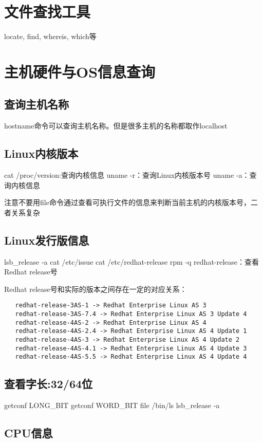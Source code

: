 \section{文件查找工具}
locate, find, whereis, which等
\section{主机硬件与OS信息查询}
\subsection*{查询主机名称}
hostname命令可以查询主机名称。但是很多主机的名称都取作localhost
\subsection*{Linux内核版本}
\begin{shellcmd}
cat /proc/version:查询内核信息
uname -r：查询Linux内核版本号
uname -a：查询内核信息
\end{shellcmd}
注意不要用file命令通过查看可执行文件的信息来判断当前主机的内核版本号，二者关系复杂
\subsection*{Linux发行版信息}
\begin{shellcmd}
lsb_release -a 
cat /etc/issue
cat /etc/redhat-release
rpm -q redhat-release：查看Redhat release号
\end{shellcmd}
Redhat release号和实际的版本之间存在一定的对应关系：
\begin{verbatim}
   redhat-release-3AS-1 -> Redhat Enterprise Linux AS 3
   redhat-release-3AS-7.4 -> Redhat Enterprise Linux AS 3 Update 4
   redhat-release-4AS-2 -> Redhat Enterprise Linux AS 4
   redhat-release-4AS-2.4 -> Redhat Enterprise Linux AS 4 Update 1
   redhat-release-4AS-3 -> Redhat Enterprise Linux AS 4 Update 2
   redhat-release-4AS-4.1 -> Redhat Enterprise Linux AS 4 Update 3
   redhat-release-4AS-5.5 -> Redhat Enterprise Linux AS 4 Update 4 
\end{verbatim} 

\subsection*{查看字长:32/64位}
\begin{shellcmd}
getconf LONG_BIT
getconf WORD_BIT
file /bin/ls
lsb_release -a
\end{shellcmd}
\subsection*{CPU信息}

